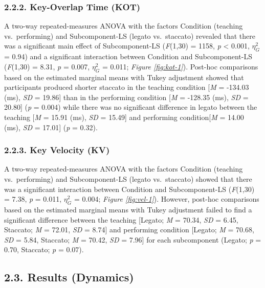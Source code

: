 \documentclass[
  english,
  man,floatsintext]{apa6}
\begin{document}
\hypertarget{key-overlap-time-kot}{%
\subsubsection{2.2.2. Key-Overlap Time (KOT)}\label{key-overlap-time-kot}}

A two-way repeated-measures ANOVA with the factors Condition (teaching vs.~performing) and Subcomponent-LS (legato vs.~staccato) revealed that there was a significant main effect of Subcomponent-LS (\emph{F}(1,30) = 1158, \emph{p} \textless{} 0.001, \(\eta_G^2\) = 0.94) and a significant interaction between Condition and Subcomponent-LS (\emph{F}(1,30) = 8.31, \emph{p} = 0.007, \(\eta_G^2\) = 0.011; \emph{Figure \ref{fig:kot-1}}). Post-hoc comparisons based on the estimated marginal means with Tukey adjustment showed that participants produced shorter staccato in the teaching condition {[}\emph{M} = -134.03 (ms), \emph{SD} = 19.86{]} than in the performing condition {[}\emph{M} = -128.35 (ms), \emph{SD} = 20.80{]} (\emph{p} = 0.004) while there was no significant difference in legato between the teaching {[}\emph{M} = 15.91 (ms), \emph{SD} = 15.49{]} and performing condition{[}\emph{M} = 14.00 (ms), \emph{SD} = 17.01{]} (\emph{p} = 0.32).

\hypertarget{key-velocity-kv}{%
\subsubsection{2.2.3. Key Velocity (KV)}\label{key-velocity-kv}}

A two-way repeated-measures ANOVA with the factors Condition (teaching vs.~performing) and Subcomponent-LS (legato vs.~staccato) showed that there was a significant interaction between Condition and Subcomponent-LS (\emph{F}(1,30) = 7.38, \emph{p} = 0.011, \(\eta_G^2\) = 0.004; \emph{Figure \ref{fig:vel-1}}). However, post-hoc comparisons based on the estimated marginal means with Tukey adjustment failed to find a significant difference between the teaching {[}Legato; \emph{M} = 70.34, \emph{SD} = 6.45, Staccato; \emph{M} = 72.01, \emph{SD} = 8.74{]} and performing condition {[}Legato; \emph{M} = 70.68, \emph{SD} = 5.84, Staccato; \emph{M} = 70.42, \emph{SD} = 7.96{]} for each subcomponent (Legato; \emph{p} = 0.70, Staccato; \emph{p} = 0.07).

\hypertarget{results-dynamics}{%
\subsection{2.3. Results (Dynamics)}\label{results-dynamics}}
\end{document}
